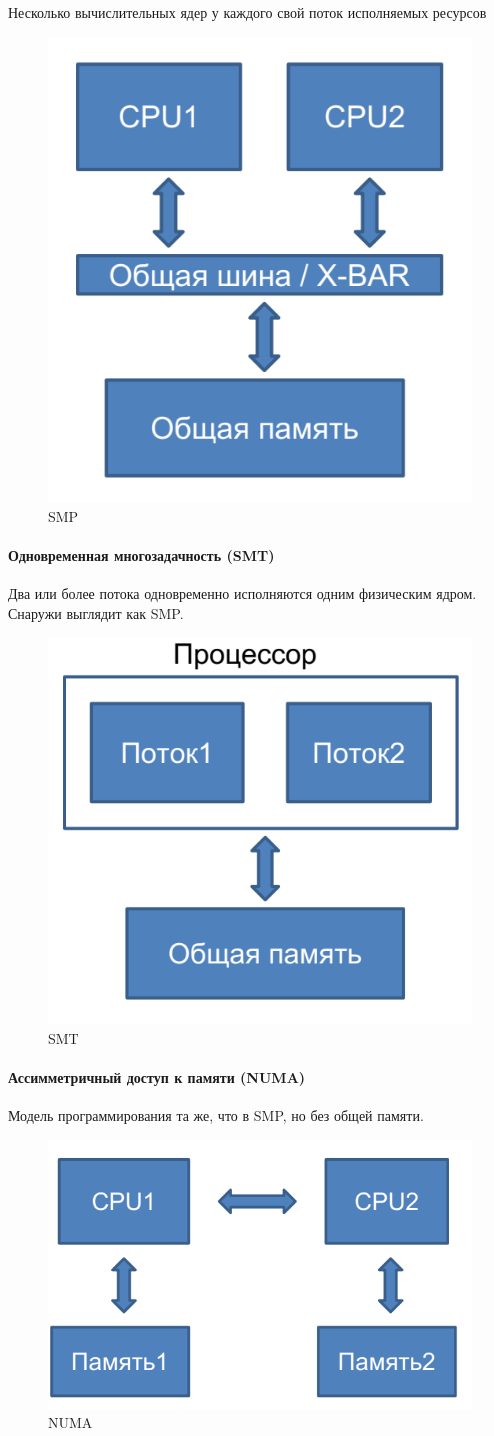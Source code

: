 \documentclass[10pt,a4paper,oneside,titlepage]{article}
\theoremstyle{plain}
\theoremstyle{defenition}
\begin{document}
Несколько вычислительных ядер у каждого свой поток исполняемых ресурсов

\begin{figure}[h]
	\centering
	\includegraphics*[width=0.4\linewidth]{pictures/SMP}
	\caption{SMP}
	\label{fig:smp}
\end{figure}



\paragraph{Одновременная многозадачность (SMT)}

Два или более потока одновременно исполняются одним физическим ядром. Снаружи выглядит как SMP.

\begin{figure}[h]
	\centering
	\includegraphics*[width=0.4\linewidth]{pictures/SMT}
	\caption{SMT}
	\label{fig:smt}
\end{figure}



\paragraph{Ассимметричный доступ к памяти (NUMA)}

Модель программирования та же, что в SMP, но без общей памяти.

\begin{figure}[h]
	\centering
	\includegraphics*[width=0.4\linewidth]{pictures/NUMA}
	\caption{NUMA}
	\label{fig:numa}
\end{figure}
\end{document}
